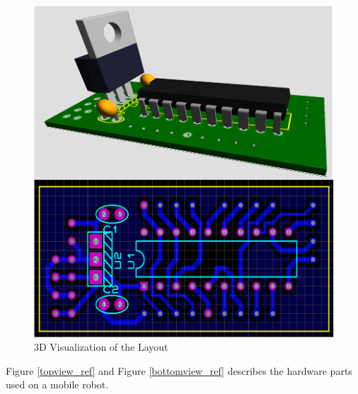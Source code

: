 \begin{figure}[H]
\caption{3D Visualization of the Layout} \label{layout_ref}
\centerline{\includegraphics[scale = 0.45]{sematik-layout}}
\end{figure} 

Figure \ref{topview_ref} and Figure \ref{bottomview_ref} describes the hardware parts used on a mobile robot.

